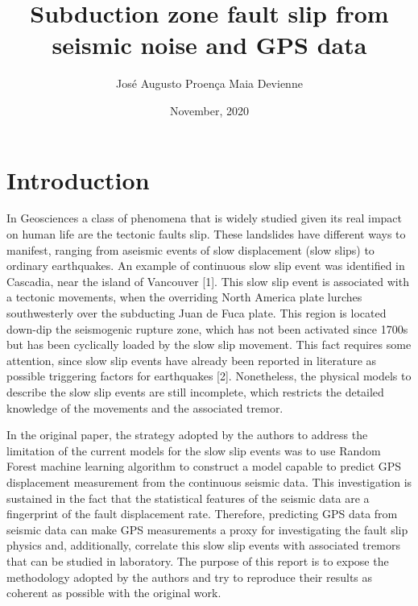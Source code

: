 \documentclass{article}
\title{Subduction zone fault slip from seismic noise and GPS data}
\author{José Augusto Proença Maia Devienne}
\affil{Big Data to Earth Scientists}
\date{November, 2020}
\begin{document}
\maketitle

\section{Introduction}

In Geosciences a class of phenomena that is widely studied given its real impact on human life are the tectonic faults slip. These landslides have different ways to manifest, ranging from aseismic events of slow displacement (slow slips) to ordinary earthquakes. An example of continuous slow slip event was identified in Cascadia, near the island of Vancouver [1]. This slow slip event is associated with a tectonic movements, when the overriding North America plate lurches southwesterly over the subducting Juan de Fuca plate. This region is located down-dip the seismogenic rupture zone, which has not been activated since 1700s but has been cyclically loaded by the slow slip movement. This fact requires some attention, since slow slip events have already been reported in literature as possible triggering factors for earthquakes [2]. Nonetheless, the physical models to describe the slow slip events are still incomplete, which restricts the detailed knowledge of the movements and the associated tremor. 

In the original paper, the strategy adopted by the authors to address the limitation of the current models for the slow slip events was to use Random Forest machine learning algorithm to construct a model capable to predict GPS displacement measurement from the continuous seismic data. This investigation is sustained in the fact that the statistical features of the seismic data are a fingerprint of the fault displacement rate. Therefore, predicting GPS data from seismic data can make GPS measurements a proxy for investigating the fault slip physics and, additionally, correlate this slow slip events with associated tremors that can be studied in laboratory. The purpose of this report is to expose the methodology adopted by the authors and try to reproduce their results as coherent as possible with the original work.



\end{document}
